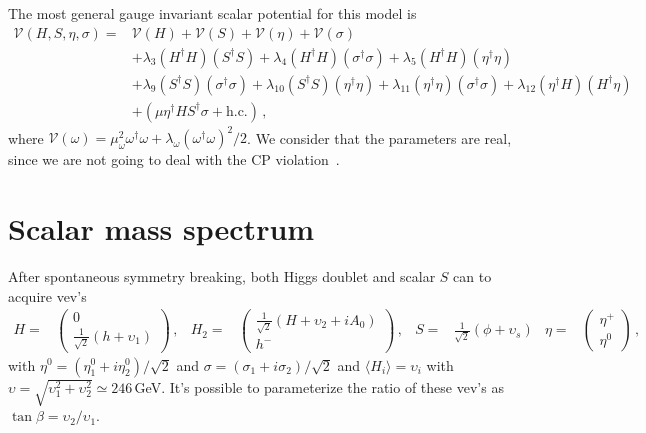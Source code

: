 \documentclass[12pt]{article}
\begin{document}
The most general gauge invariant scalar potential for this model is
%
\begin{align*}
    \mathcal{V}(H, S, \eta, \sigma) = & \mathcal{V}(H) + \mathcal{V}(S) + \mathcal{V}(\eta) + \mathcal{V}(\sigma) \\
    &+  \lambda_{3} (H^{\dagger} H ) (S^{\dagger} S) + \lambda_{4} (H^{\dagger} H ) (\sigma^{\dagger} \sigma ) + \lambda_{5} (H^{\dagger} H ) (\eta^{\dagger} \eta )\\
    &+ \lambda_{9} (S^{\dagger} S) (\sigma^{\dagger} \sigma ) + \lambda_{10} (S^{\dagger} S) (\eta^{\dagger} \eta ) + \lambda_{11} (\eta^{\dagger} \eta ) (\sigma^{\dagger} \sigma ) + \lambda_{12} (\eta^{\dagger} H ) (H^{\dagger} \eta ) \\
    &+ (\mu \eta^{\dagger} H S^{\dagger} \sigma + \text{h.c.})\,,
\end{align*}
%
where $\mathcal{V}(\omega) = \mu^{2}_{\omega} \omega^{\dagger} \omega + \lambda_{\omega} (\omega^{\dagger} \omega)^{2}/2$. We consider that the parameters are real, since we are not going to deal with the CP violation~\cite{Abe:2016sqa}.

\section{Scalar mass spectrum}
\label{sec:ScaMassSpect}

 After spontaneous symmetry breaking, both Higgs doublet and scalar $S$ can to acquire vev's
%
\begin{align*}
    H =& \begin{pmatrix}0 \\ \frac{1}{\sqrt{2}} (h+\upsilon_{1}) \end{pmatrix} \,,
    &H_{2} =& \begin{pmatrix}\frac{1}{\sqrt{2}} (H+\upsilon_{2}+iA_{0}) \\ h^{-} \end{pmatrix} \,, &S =& \frac{1}{\sqrt{2}} (\phi+\upsilon_{s})
    &\eta =& \begin{pmatrix}\eta^{+} \\ \eta^{0} \end{pmatrix} \,,
\end{align*}
%
with $\eta^{0} = (\eta_{1}^{0}+i \eta_{2}^{0})/\sqrt{2}$ and $\sigma = ({\sigma}_{1}+i {\sigma}_{2})/\sqrt{2}$ and $\langle  H_{i} \rangle = \upsilon_{i}$ with $\upsilon=\sqrt{\upsilon_{1}^2+\upsilon_{2}^2} \simeq 246$\,GeV. It's possible to parameterize the ratio of these vev's as $\tan \beta = \upsilon_{2}/\upsilon_{1}$.
\end{document}
